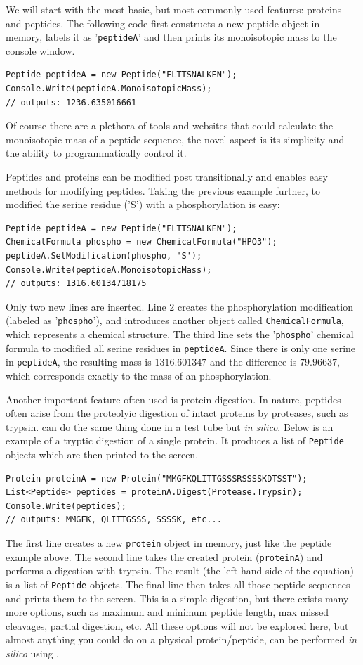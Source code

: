 We will start with the most basic, but most commonly used features: proteins and peptides. The following code first constructs a new peptide object in memory, labels it as '\texttt{peptideA}' and then prints its monoisotopic mass to the console window.
\begin{lstlisting}
Peptide peptideA = new Peptide("FLTTSNALKEN");
Console.Write(peptideA.MonoisotopicMass);
// outputs: 1236.635016661
\end{lstlisting}
Of course there are a plethora of tools and websites that could calculate the monoisotopic mass of a peptide sequence, the novel aspect is its simplicity and the ability to programmatically control it.

Peptides and proteins can be modified post transitionally and \csmsl{} enables easy methods for modifying peptides. Taking the previous example further, to modified the serine residue ('S') with a phosphorylation is easy:
\begin{lstlisting}
Peptide peptideA = new Peptide("FLTTSNALKEN");
ChemicalFormula phospho = new ChemicalFormula("HPO3");
peptideA.SetModification(phospho, 'S');
Console.Write(peptideA.MonoisotopicMass);
// outputs: 1316.60134718175
\end{lstlisting}
Only two new lines are inserted. Line 2 creates the phosphorylation modification (labeled as '\texttt{phospho}'), and introduces another \csmsl{} object called \texttt{ChemicalFormula}, which represents a chemical structure. The third line sets the '\texttt{phospho}' chemical formula to modified all serine residues in \texttt{peptideA}. Since there is only one serine in \texttt{peptideA}, the resulting mass is $1316.601347$ and the difference is $79.96637$, which corresponds exactly to the mass of an phosphorylation.

Another important feature often used is protein digestion. In nature, peptides often arise from the proteolyic digestion of intact proteins by proteases, such as trypsin. \csmsl{} can do the same thing done in a test tube but \emph{in silico}. Below is an example of a tryptic digestion of a single protein. It produces a list of \texttt{Peptide} objects which are then printed to the screen.
\begin{lstlisting}
Protein proteinA = new Protein("MMGFKQLITTGSSSRSSSSKDTSST");
List<Peptide> peptides = proteinA.Digest(Protease.Trypsin);
Console.Write(peptides);
// outputs: MMGFK, QLITTGSSS, SSSSK, etc...
\end{lstlisting}
The first line creates a new \texttt{protein} object in memory, just like the peptide example above. The second line takes the created protein (\texttt{proteinA}) and performs a digestion with trypsin. The result (the left hand side of the equation) is a list of \texttt{Peptide} objects. The final line then takes all those peptide sequences and prints them to the screen. This is a simple digestion, but there exists many more options, such as maximum and minimum peptide length, max missed cleavages, partial digestion, etc. All these options will not be explored here, but almost anything you could do on a physical protein/peptide, can be performed \emph{in silico} using \csmsl{}.

